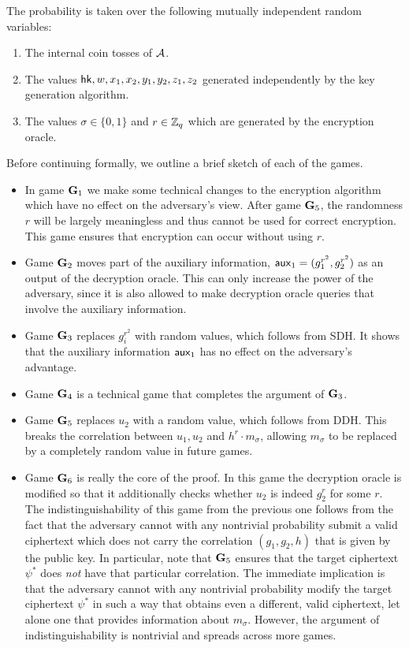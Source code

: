 The probability is taken over the following mutually independent random variables:	\begin{enumerate}
	\item The internal coin tosses of $\mathcal{A}$.
	\item The values $\mathsf{hk},w,x_1,x_2,y_1,y_2,z_1,z_2$ generated independently by the key generation algorithm.
	\item The values $\sigma\in\{0,1\}$ and $r\in\mathbb{Z}_q$ which are generated by the encryption oracle.
\end{enumerate}

Before continuing formally, we outline a brief sketch of each of the games.

\begin{itemize}
	\item In game $\mathbf{G}_1$ we make some technical changes to the encryption algorithm which have no effect on the adversary's view. After game $\mathbf{G}_5$, the randomness $r$ will be largely meaningless and thus cannot be used for correct encryption. This game ensures that encryption can occur without using $r$.
	\item Game $\mathbf{G}_2$ moves part of the auxiliary information, $\mathsf{aux}_1 =(g_1^{r^2}, g_2^{r^2})$ as an output of the decryption oracle. This can only increase the power of the adversary, since it is also allowed to make decryption oracle queries that involve the auxiliary information.
	\item Game $\mathbf{G}_3$ replaces $g_i^{r^2}$ with random values, which follows from SDH. It shows that the auxiliary information $\mathsf{aux}_1$ has no effect on the adversary's advantage.
	\item Game $\mathbf{G}_4$ is a technical game that completes the argument of $\mathbf{G}_3$.
	\item Game $\mathbf{G}_5$ replaces $u_2$ with a random value, which follows from DDH. This breaks the correlation between $u_1, u_2$ and $h^r\cdot m_\sigma$, allowing $m_\sigma$ to be replaced by a completely random value in future games.
	\item Game $\mathbf{G}_6$ is really the core of the proof. In this game the decryption oracle is modified so that it additionally checks whether $u_2$ is indeed $g_2^r$ for some $r$. The indistinguishability of this game from the previous one follows from the fact that the adversary cannot with any nontrivial probability submit a valid ciphertext which does not carry the correlation $(g_1, g_2, h)$ that is given by the public key. In particular, note that $\mathbf{G}_5$ ensures that the target ciphertext $\psi^{*}$ does \textit{not} have that particular correlation. The immediate implication is that the adversary cannot with any nontrivial probability modify the target ciphertext $\psi^{*}$ in such a way that obtains even a different, valid ciphertext, let alone one that provides information about $m_\sigma$. However, the argument of indistinguishability is nontrivial and spreads across more games.

\end{itemize}
